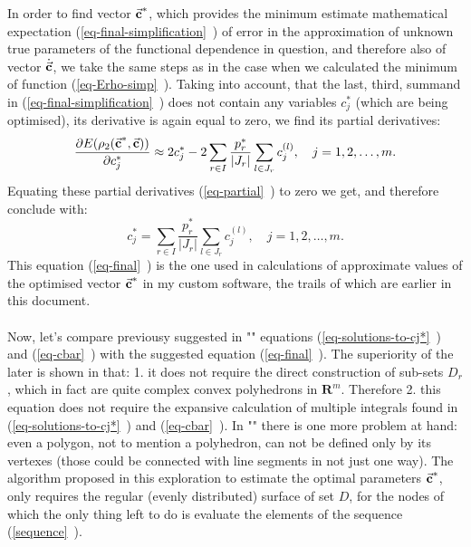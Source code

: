 In order to find vector $\vec{\textbf{c}}^{*}$, which provides the minimum estimate mathematical expectation (\vref{eq-final-simplification}~) of error in the approximation of unknown true parameters of the functional dependence in question, and therefore also of vector $\dot{\vec{\textbf{c}}}$, we take the same steps as in the case when we calculated the minimum of function (\vref{eq-Erho-simp}~). Taking into account, that the last, third, summand in (\vref{eq-final-simplification}~) does not contain 
any variables $c_{j}^{*}$ (which are being optimised), its derivative is again equal to zero, we find its partial derivatives:
\begin{equation}
\frac{\partial E (\rho_{2}(\vec{\textbf{c}}^{*},\vec{\textbf{c}}))}{\partial c_{j}^{*}} \approx 2c_{j}^{*} - 2 \sum\limits_{r \in I} \frac{p_{r}^{*}}{\left| J_{r} \right|} \sum\limits_{l \in J_{r}} c_{j}^{(l)}, \quad j=1,2,\dots,m. \label{eq-partial}
\end{equation}
Equating these partial derivatives (\vref{eq-partial}~) to zero we get, and therefore conclude with:
\begin{equation}
c_{j}^{*} = \sum\limits_{r \in I} \frac{p_{r}^{*}}{\left| J_{r} \right|} \sum\limits_{l \in J_{r}} c_{j}^{(l)}, \quad j=1,2,\dots,m. \label{eq-final}
\end{equation}
This equation (\vref{eq-final}~) is the one used in calculations of approximate values of the optimised vector $\vec{\textbf{c}}^{*}$ in my custom software, the trails of which are earlier  in this document.\\
\\
Now, let's compare previousy suggested in "\cite{balk_2010}" equations (\vref{eq-solutions-to-cj*}~) and (\vref{eq-cbar}~) with the suggested equation (\vref{eq-final}~). The superiority of the later is shown in that: 1. it does not require the direct construction of sub-sets $D_{r}$
, which in fact are quite complex convex polyhedrons in $\boldsymbol{R}^{m}$. Therefore 2. this equation does not require the expansive calculation of multiple integrals found in (\vref{eq-solutions-to-cj*}~) and (\vref{eq-cbar}~).  In "\cite{balk_2010}" there is one more problem at hand: even a polygon, not to mention a polyhedron, can not be defined only by its vertexes (those could be connected with line segments in not just one way). The algorithm proposed in this exploration to estimate the optimal parameters $\vec{\textbf{c}}^{*}$, only requires the regular (evenly distributed) surface of set $D$, for the nodes of which the only thing left to do is evaluate the elements of the sequence (\vref{sequence}~).

\newpage






